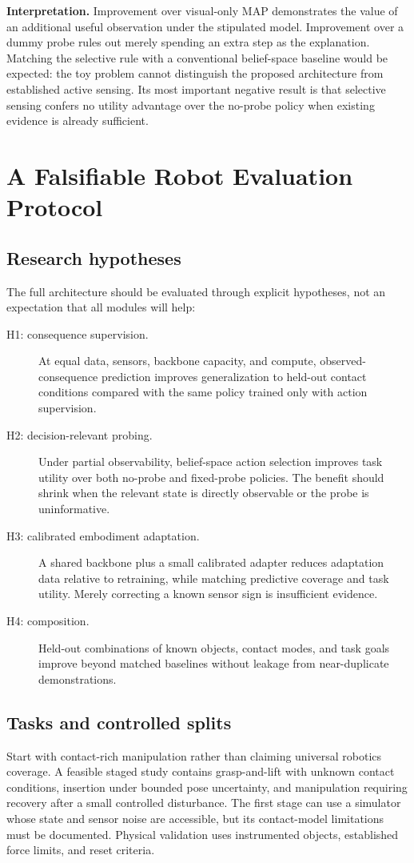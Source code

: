 \documentclass[11pt]{article}
\begin{document}
\textbf{Interpretation.} Improvement over visual-only MAP demonstrates the value of an additional useful observation under the stipulated model. Improvement over a dummy probe rules out merely spending an extra step as the explanation. Matching the selective rule with a conventional belief-space baseline would be expected: the toy problem cannot distinguish the proposed architecture from established active sensing. Its most important negative result is that selective sensing confers no utility advantage over the no-probe policy when existing evidence is already sufficient.

\section{A Falsifiable Robot Evaluation Protocol}
\subsection{Research hypotheses}
The full architecture should be evaluated through explicit hypotheses, not an expectation that all modules will help:
\begin{description}
\item[H1: consequence supervision.] At equal data, sensors, backbone capacity, and compute, observed-consequence prediction improves generalization to held-out contact conditions compared with the same policy trained only with action supervision.
\item[H2: decision-relevant probing.] Under partial observability, belief-space action selection improves task utility over both no-probe and fixed-probe policies. The benefit should shrink when the relevant state is directly observable or the probe is uninformative.
\item[H3: calibrated embodiment adaptation.] A shared backbone plus a small calibrated adapter reduces adaptation data relative to retraining, while matching predictive coverage and task utility. Merely correcting a known sensor sign is insufficient evidence.
\item[H4: composition.] Held-out combinations of known objects, contact modes, and task goals improve beyond matched baselines without leakage from near-duplicate demonstrations.
\end{description}

\subsection{Tasks and controlled splits}
Start with contact-rich manipulation rather than claiming universal robotics coverage. A feasible staged study contains grasp-and-lift with unknown contact conditions, insertion under bounded pose uncertainty, and manipulation requiring recovery after a small controlled disturbance. The first stage can use a simulator whose state and sensor noise are accessible, but its contact-model limitations must be documented. Physical validation uses instrumented objects, established force limits, and reset criteria.
\end{document}
